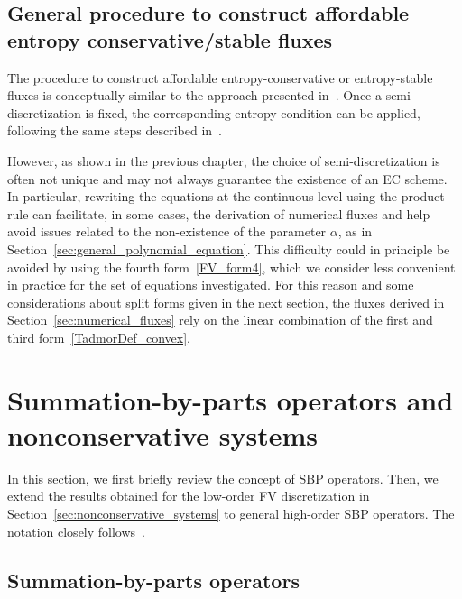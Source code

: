 \documentclass[]{scrartcl}
\renewcommand{\vec}[1]{\boldsymbol{#1}}
\theoremstyle{definition}
\begin{document}
\subsection{General procedure to construct affordable entropy conservative/stable fluxes}
The procedure to construct affordable entropy-conservative or entropy-stable fluxes is conceptually similar to the approach presented in~\cite{Ranocha2018}.
Once a semi-discretization is fixed, the corresponding entropy condition can be applied, following the same steps described in~\cite[Procedure 4.1]{Ranocha2018}.

However, as shown in the previous chapter, the choice of semi-discretization is often not unique and may not always guarantee the existence of an EC scheme.
In particular, rewriting the equations at the continuous level using the product rule can facilitate, in some cases, the derivation of numerical fluxes and help avoid issues related to the non-existence of the parameter $\alpha$, as in Section~\ref{sec:general_polynomial_equation}.
This difficulty could in principle be avoided by using the fourth form~\eqref{FV_form4}, which we consider less convenient in practice for the set of equations investigated.
For this reason and some considerations about split forms given in the next section, the fluxes derived in Section~\ref{sec:numerical_fluxes} rely on the linear combination of the first and third form~\eqref{TadmorDef_convex}.


\section{Summation-by-parts operators and nonconservative systems}
\label{sec:sbp_cartesian}
In this section, we first briefly review the concept of SBP operators.
Then, we extend the results obtained for the low-order FV discretization in Section~\ref{sec:nonconservative_systems} to general high-order SBP operators.
The notation closely follows~\cite{Ranocha2018, ranocha2018thesis}.

\subsection{Summation-by-parts operators}
\end{document}
